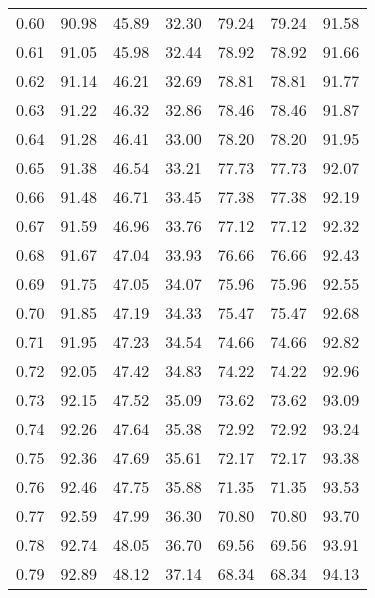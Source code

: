 \begin{tabular}{|c|c|c|c|c|c|c|}
      0.60 &     90.98 &     45.89 &      32.30 &   79.24 &      79.24 &         91.58 \\
      0.61 &     91.05 &     45.98 &      32.44 &   78.92 &      78.92 &         91.66 \\
      0.62 &     91.14 &     46.21 &      32.69 &   78.81 &      78.81 &         91.77 \\
      0.63 &     91.22 &     46.32 &      32.86 &   78.46 &      78.46 &         91.87 \\
      0.64 &     91.28 &     46.41 &      33.00 &   78.20 &      78.20 &         91.95 \\
      0.65 &     91.38 &     46.54 &      33.21 &   77.73 &      77.73 &         92.07 \\
      0.66 &     91.48 &     46.71 &      33.45 &   77.38 &      77.38 &         92.19 \\
      0.67 &     91.59 &     46.96 &      33.76 &   77.12 &      77.12 &         92.32 \\
      0.68 &     91.67 &     47.04 &      33.93 &   76.66 &      76.66 &         92.43 \\
      0.69 &     91.75 &     47.05 &      34.07 &   75.96 &      75.96 &         92.55 \\
      0.70 &     91.85 &     47.19 &      34.33 &   75.47 &      75.47 &         92.68 \\
      0.71 &     91.95 &     47.23 &      34.54 &   74.66 &      74.66 &         92.82 \\
      0.72 &     92.05 &     47.42 &      34.83 &   74.22 &      74.22 &         92.96 \\
      0.73 &     92.15 &     47.52 &      35.09 &   73.62 &      73.62 &         93.09 \\
      0.74 &     92.26 &     47.64 &      35.38 &   72.92 &      72.92 &         93.24 \\
      0.75 &     92.36 &     47.69 &      35.61 &   72.17 &      72.17 &         93.38 \\
      0.76 &     92.46 &     47.75 &      35.88 &   71.35 &      71.35 &         93.53 \\
      0.77 &     92.59 &     47.99 &      36.30 &   70.80 &      70.80 &         93.70 \\
      0.78 &     92.74 &     48.05 &      36.70 &   69.56 &      69.56 &         93.91 \\
      0.79 &     92.89 &     48.12 &      37.14 &   68.34 &      68.34 &         94.13 \\

\end{tabular}
